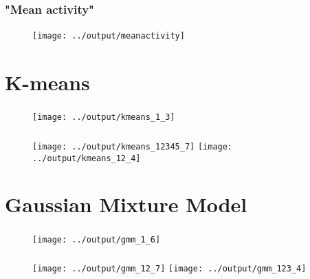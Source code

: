 \documentclass[12pt, english]{beamer}
\begin{document}
\begin{frame}
  \frametitle{"Mean activity"}
  \framesubtitle{}
  

\begin{figure}
\centering
\texttt{[image: ../output/meanactivity]}
    \caption*{}
    \label{fig:mean}  
\end{figure}

\end{frame}

\section{K-means}
\begin{frame}
  \frametitle{}
  \framesubtitle{}

\begin{figure}
\centering
\texttt{[image: ../output/kmeans\_1\_3]}
    \caption*{}
    \label{fig:kmeams}  
\end{figure}
\end{frame}

\begin{frame}
  \frametitle{}
  \framesubtitle{}

\begin{figure}
\centering
\texttt{[image: ../output/kmeans\_12345\_7]}
\texttt{[image: ../output/kmeans\_12\_4]}
    \caption*{}
    \label{fig:kmeams2}  
\end{figure}
\end{frame}

\section{Gaussian Mixture Model}
\begin{frame}
  \frametitle{}
  \framesubtitle{}

\begin{figure}
\centering
\texttt{[image: ../output/gmm\_1\_6]}
    \caption*{}
    \label{fig:gmm}  
\end{figure}
\end{frame}

\begin{frame}
  \frametitle{}
  \framesubtitle{}

\begin{figure}
\centering
\texttt{[image: ../output/gmm\_12\_7]}
\texttt{[image: ../output/gmm\_123\_4]}
    \caption*{}
    \label{fig:gmm2}  
\end{figure}
\end{frame}
\end{document}

